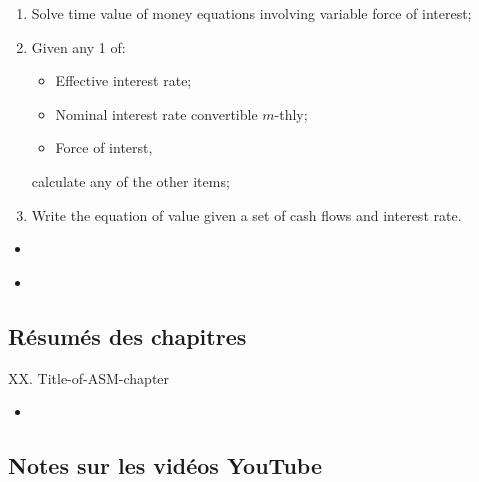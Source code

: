 \begin{outcomes}
\begin{enumerate}[label = \alph*)]
\begin{multicols*}{3}
		\begin{itemize}[leftmargin = *]
		\item	Interest rate;
		\item	Period of time;
		\item	Present value;
		\item	Current value;
		\item	Future value,
		\end{itemize}
		\end{multicols*}
		calculate the remaining item using \textit{simple} or \textit{compound} interest;
	\item[]	Solve time value of money equations involving variable force of interest;
	\item	Given any 1 of:
		\begin{itemize}[leftmargin = *]
		\item	Effective interest rate;
		\item	Nominal interest rate convertible $m$-thly;
		\item	Force of interst,
		\end{itemize}
		calculate any of the other items;
	\item	Write the equation of value given a set of cash flows and interest rate.
\end{enumerate}
\end{outcomes}

\begin{ASM_chapter}
\begin{itemize}
	\item	{}
\end{itemize}
\end{ASM_chapter}

\begin{YTB_vids}
\begin{itemize}
	\item	
\end{itemize}
\end{YTB_vids}

\subsection{Résumés des chapitres}

\begin{CHPT_SUMM_AUTO}[label = {L.-XX}]{XX. Title-of-ASM-chapter}
	\begin{itemize}
		\item	
	\end{itemize}
\end{CHPT_SUMM_AUTO}

\subsection{Notes sur les vidéos YouTube}

